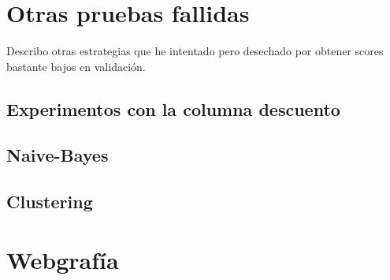 \documentclass{article}
\begin{document}
\section{Otras pruebas fallidas}

Describo otras estrategias que he intentado pero desechado por obtener
scores bastante bajos en validación.

\subsection{Experimentos con la columna descuento} \label{descuento}

\subsection{Naive-Bayes}

\subsection{Clustering}

\section{Webgrafía}
\end{document}
